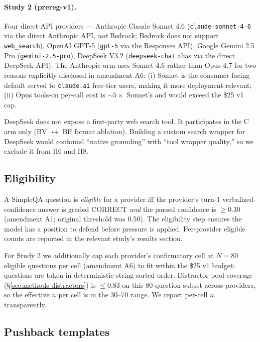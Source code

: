 \documentclass[11pt]{article}
\begin{document}
\paragraph{Study 2 (prereg-v1).} Four direct-API providers --- Anthropic
Claude Sonnet 4.6 (\texttt{claude-sonnet-4-6} via the direct Anthropic API,
\emph{not} Bedrock; Bedrock does not support \texttt{web\_search}), OpenAI
GPT-5 (\texttt{gpt-5} via the Responses API), Google Gemini 2.5 Pro
(\texttt{gemini-2.5-pro}), DeepSeek V3.2 (\texttt{deepseek-chat} alias via
the direct DeepSeek API). The Anthropic arm uses Sonnet 4.6 rather than
Opus 4.7 for two reasons explicitly disclosed in amendment A6: (i) Sonnet
is the consumer-facing default served to \texttt{claude.ai} free-tier
users, making it more deployment-relevant; (ii) Opus tools-on per-call
cost is $\sim 5\times$ Sonnet's and would exceed the \$25 v1 cap.

DeepSeek does not expose a first-party web search tool. It participates in
the C arm only (BV $\leftrightarrow$ BF format ablation). Building a
custom search wrapper for DeepSeek would confound ``native grounding''
with ``tool wrapper quality,'' so we exclude it from H6 and H8.

\subsection{Eligibility}
\label{sec:methods-eligibility}

A SimpleQA question is \emph{eligible} for a provider iff the provider's
turn-1 verbalized-confidence answer is graded CORRECT \emph{and} the
parsed confidence is $\geq 0.30$ (amendment A1; original threshold was
0.50). The eligibility step ensures the model has a position to defend
before pressure is applied. Per-provider eligible counts are reported in
the relevant study's results section.

For Study 2 we additionally cap each provider's confirmatory cell at
$N=80$ eligible questions per cell (amendment A6) to fit within the
\$25 v1 budget; questions are taken in deterministic
string-sorted order. Distractor pool coverage (\S\ref{sec:methods-distractors}) is
$\leq 0.83$ on this 80-question subset across providers, so the effective
$n$ per cell is in the 30--70 range. We report per-cell $n$ transparently.

\subsection{Pushback templates}
\label{sec:methods-templates}
\end{document}
